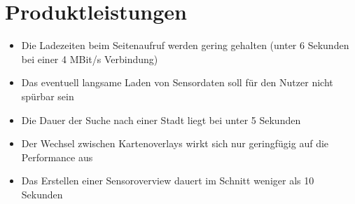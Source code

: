 \section{Produktleistungen}
\begin{itemize}
    \item Die Ladezeiten beim Seitenaufruf werden gering gehalten (unter 6 Sekunden bei einer 4 MBit/s Verbindung)
    \item Das eventuell langsame Laden von Sensordaten soll für den Nutzer nicht spürbar sein
    \item Die Dauer der Suche nach einer Stadt liegt bei unter 5 Sekunden
    \item Der Wechsel zwischen Kartenoverlays wirkt sich nur geringfügig auf die Performance aus
    \item Das Erstellen einer Sensoroverview dauert im Schnitt weniger als 10 Sekunden
\end{itemize}